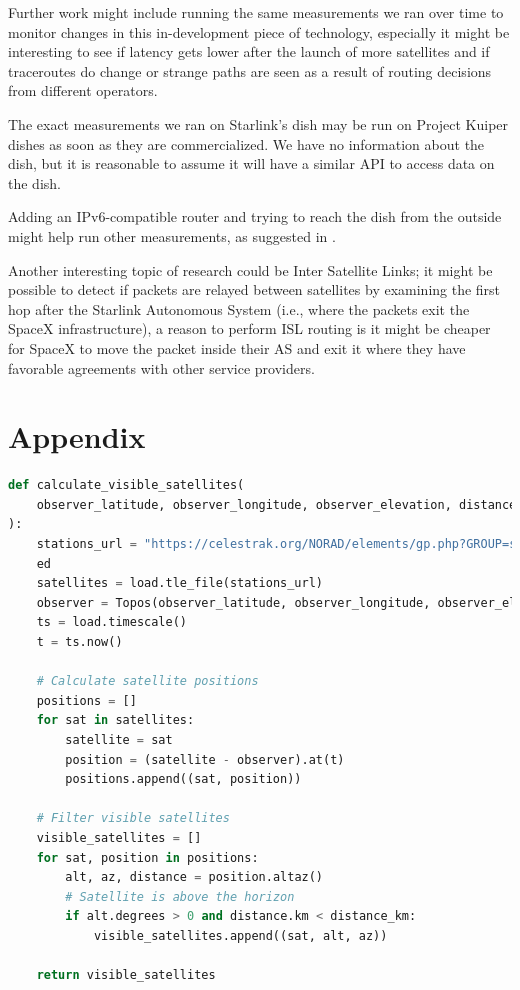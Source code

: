 \documentclass[IN,11pt,twoside,openright,idp,english]{tumthesis}
\begin{document}
Further work might include running the same measurements we ran over time to monitor changes in this in-development piece of technology, especially it might be interesting to see if latency gets lower after the launch of more satellites and if traceroutes do change or strange paths are seen as a result of routing decisions from different operators.

The exact measurements we ran on Starlink's dish may be run on Project Kuiper dishes as soon as they are commercialized. We have no information about the dish, but it is reasonable to assume it will have a similar API to access data on the dish.

Adding an IPv6-compatible router and trying to reach the dish from the outside might help run other measurements, as suggested in \cite{izhikevich2023democratizing}.

Another interesting topic of research could be Inter Satellite Links; it might be possible to detect if packets are relayed between satellites by examining the first hop after the Starlink Autonomous System (i.e., where the packets exit the SpaceX infrastructure), a reason to perform ISL routing is it might be cheaper for SpaceX to move the packet inside their AS and exit it where they have favorable agreements with other service providers.


\appendix
\chapter{Appendix}

\begin{lstlisting}[language=python,caption={the \texttt{calculate\_visible\_satellites} function},captionpos=b]
def calculate_visible_satellites(
    observer_latitude, observer_longitude, observer_elevation, distance_km
):
    stations_url = "https://celestrak.org/NORAD/elements/gp.php?GROUP=starlink&FORMAT=tle"
    ed
    satellites = load.tle_file(stations_url)
    observer = Topos(observer_latitude, observer_longitude, observer_elevation)
    ts = load.timescale()
    t = ts.now()

    # Calculate satellite positions
    positions = []
    for sat in satellites:
        satellite = sat
        position = (satellite - observer).at(t)
        positions.append((sat, position))

    # Filter visible satellites
    visible_satellites = []
    for sat, position in positions:
        alt, az, distance = position.altaz()
        # Satellite is above the horizon
        if alt.degrees > 0 and distance.km < distance_km:
            visible_satellites.append((sat, alt, az))

    return visible_satellites
\end{lstlisting}
\end{document}
